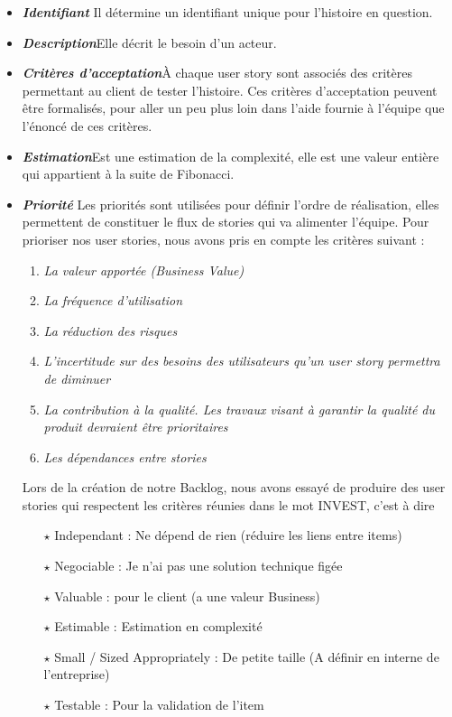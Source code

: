 \begin{itemize}[label=$\square$,leftmargin=* ,parsep=0cm,itemsep=0cm,topsep=0cm]
    \item \textit{\textbf{Identifiant}} Il détermine un identifiant unique pour l’histoire en question.\\
 	
 	\item \textit{\textbf{Description}}Elle décrit le besoin d’un acteur.\\
 	
 	\item \textit{\textbf{Critères d’acceptation}}À chaque user story sont associés des critères permettant au client
 	de tester l’histoire. Ces critères d’acceptation peuvent être formalisés, pour aller un peu plus
 	loin dans l’aide fournie à l’équipe que l’énoncé de ces critères.\\
 
 	\item \textit{\textbf{Estimation}}Est une estimation de la complexité, elle est une valeur entière qui appartient à la suite de Fibonacci.
 	 
 	
 	\item \textit{\textbf{Priorité}}  Les priorités sont utilisées pour définir l’ordre de réalisation, elles permettent de
 	constituer le flux de stories qui va alimenter l’équipe. Pour prioriser nos user stories, nous
 	avons pris en compte les critères suivant :
 	\begin{enumerate}
 		\item \textit{La valeur apportée (Business Value)}
 		\item \textit{La fréquence d’utilisation}
 		\item \textit{La réduction des risques}
 		\item \textit{L’incertitude sur des besoins des utilisateurs qu’un user story permettra de diminuer}
 		\item \textit{La contribution à la qualité. Les travaux visant à garantir la qualité du produit devraient être prioritaires}
 		\item \textit{Les dépendances entre stories}
 	\end{enumerate}
 	
Lors de la création de notre Backlog, nous avons essayé de produire des user stories qui respectent
les critères réunies dans le mot INVEST, c’est à dire
	\begin{itemize}	
\item[$\star$] Independant : Ne dépend de rien (réduire les liens entre items)
\item[$\star$] Negociable : Je n’ai pas une solution technique figée
\item[$\star$] Valuable : pour le client (a une valeur Business)
\item[$\star$] Estimable : Estimation en complexité
\item[$\star$] Small / Sized Appropriately : De petite taille (A définir en interne de l’entreprise)
\item[$\star$] Testable : Pour la validation de l’item
\end{itemize}
\end{itemize}
